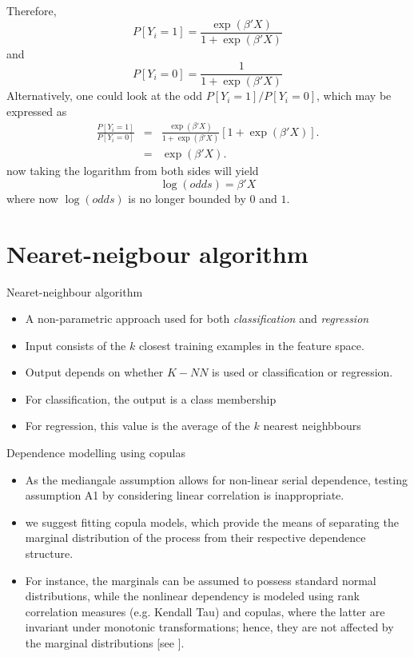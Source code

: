 \documentclass{beamer}
\begin{document}
\begin{frame}
Therefore,
\[
P[Y_i=1]=\frac{\exp(\beta'X)}{1+\exp(\beta'X)}
\]
and
\[
P[Y_i=0]=\frac{1}{1+\exp(\beta'X)}
\]
Alternatively, one could look at the odd $P[Y_i=1]/P[Y_i=0]$, which may be expressed as
\begin{eqnarray*}
\frac{P[Y_i=1]}{P[Y_i=0]}&=&\frac{\exp(\beta'X)}{1+\exp(\beta'X)}[1+\exp(\beta'X)].\\
&=&\exp(\beta'X).
\end{eqnarray*}
now taking the logarithm from both sides will yield
\begin{equation}
\log(odds)=\beta'X
\end{equation}
where now $\log(odds)$ is no longer bounded by $0$ and $1$.
\end{frame}
\section{Nearet-neigbour algorithm}
\begin{frame}{Nearet-neighbour algorithm}
\begin{itemize}
\item{} A non-parametric approach used for both \textit{classification} and \textit{regression}
\item{} Input consists of the $k$ closest training examples in the feature space.
\item{} Output depends on whether $K-NN$ is used or classification or regression.
\item{} For classification, the output is a class membership
\item{} For regression, this value is the average of the $k$ nearest neighbbours
\end{itemize}
\end{frame}
\begin{frame}{Dependence modelling using copulas}
\begin{itemize}
\item {} As the mediangale assumption allows for non-linear serial dependence, testing assumption A1 by considering linear correlation is inappropriate. 

\item{} we suggest fitting copula models, which provide the means of separating the marginal distribution of the process from their respective dependence structure.
\item{} For instance, the marginals can be assumed to possess standard normal distributions, while the nonlinear dependency is modeled using rank correlation measures (e.g. Kendall Tau) and copulas, where the latter are invariant under monotonic transformations; hence, they are not affected by the marginal distributions [see ].
\end{itemize}
\end{frame}
\end{document}
